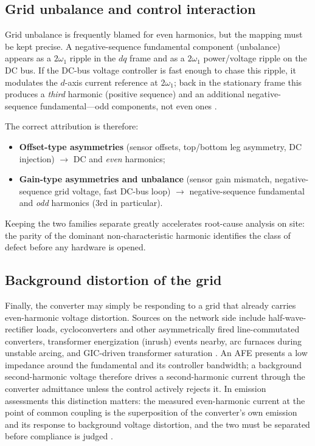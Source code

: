 \documentclass[11pt,a4paper]{article}
\newcommand{\dq}{\ensuremath{dq}}
\begin{document}
\subsection{Grid unbalance and control interaction}

Grid unbalance is frequently blamed for even harmonics, but the mapping must be
kept precise. A negative-sequence fundamental component (unbalance) appears as
a $2\omega_1$ ripple in the $\dq$ frame and as a $2\omega_1$ power/voltage
ripple on the DC bus. If the DC-bus voltage controller is fast enough to chase
this ripple, it modulates the $d$-axis current reference at $2\omega_1$; back
in the stationary frame this produces a \emph{third} harmonic (positive
sequence) and an additional negative-sequence fundamental---odd components, not
even ones \cite{yazdani,teodorescu}.

The correct attribution is therefore:
%
\begin{itemize}
\item \textbf{Offset-type asymmetries} (sensor offsets, top/bottom leg
asymmetry, DC injection) $\rightarrow$ DC and \emph{even} harmonics;
\item \textbf{Gain-type asymmetries and unbalance} (sensor gain mismatch,
negative-sequence grid voltage, fast DC-bus loop) $\rightarrow$
negative-sequence fundamental and \emph{odd} harmonics (3rd in particular).
\end{itemize}
%
Keeping the two families separate greatly accelerates root-cause analysis on
site: the parity of the dominant non-characteristic harmonic identifies the
class of defect before any hardware is opened.

\subsection{Background distortion of the grid}
\label{sec:background}

Finally, the converter may simply be responding to a grid that already carries
even-harmonic voltage distortion. Sources on the network side include
half-wave-rectifier loads, cycloconverters and other asymmetrically fired
line-commutated converters, transformer energization (inrush) events nearby,
arc furnaces during unstable arcing, and GIC-driven transformer saturation
\cite{arrillaga,bollen,taskforce}. An AFE presents a low impedance around the
fundamental and its controller bandwidth; a background second-harmonic voltage
therefore drives a second-harmonic current through the converter admittance
unless the control actively rejects it. In emission assessments this
distinction matters: the measured even-harmonic current at the point of common
coupling is the superposition of the converter's own emission and its response
to background voltage distortion, and the two must be separated before
compliance is judged \cite{iec61000_3_6}.
\end{document}
